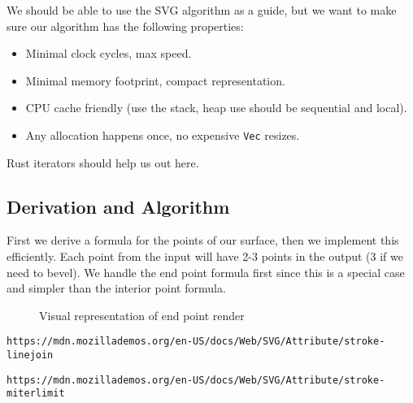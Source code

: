 \documentclass[]{article}
\begin{document}
We should be able to use the SVG algorithm as a guide, but we want to make sure our algorithm has the following properties:
\begin{itemize}
	\item Minimal clock cycles, max speed.
	\item Minimal memory footprint, compact representation.
	\item CPU cache friendly (use the stack, heap use should be sequential and local).
	\item Any allocation happens once, no expensive \texttt{Vec} resizes.
\end{itemize}
Rust iterators should help us out here.

\subsection{Derivation and Algorithm}
First we derive a formula for the points of our surface, then we implement this efficiently. Each point from the input will have 2-3 points in the output (3 if we need to bevel). We handle the end point formula first since this is a special case and simpler than the interior point formula.

\begin{figure}[!htbp]
	\centering
	\def\svgwidth{200pt}
	
	\caption{Visual representation of end point render}
\end{figure}

\begin{thebibliography}{9}
	\texttt{https://mdn.mozillademos.org/en-US/docs/Web/SVG/Attribute/stroke-linejoin}
	
	\texttt{https://mdn.mozillademos.org/en-US/docs/Web/SVG/Attribute/stroke-miterlimit}
\end{thebibliography}
\end{document}

